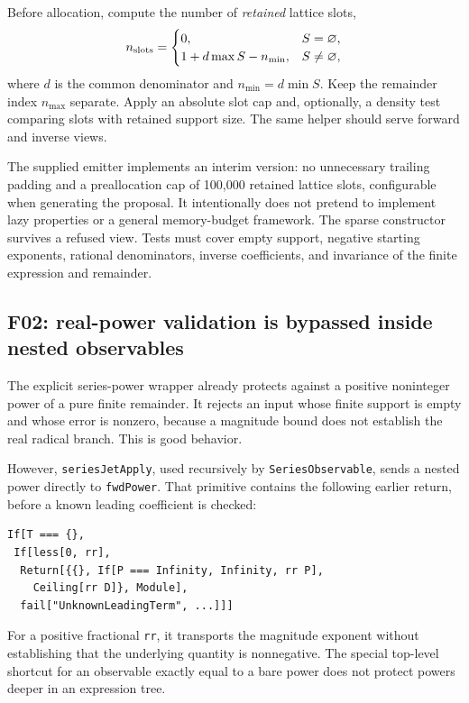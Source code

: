 Before allocation, compute the number of \emph{retained} lattice slots,
\[
 n_{\rm slots}=\begin{cases}
 0,&S=\varnothing,\\
 1+d\max S-n_{\min},&S\ne\varnothing,
 \end{cases}
\]
where $d$ is the common denominator and $n_{\min}=d\min S$. Keep the remainder index $n_{\max}$ separate. Apply an absolute slot cap and, optionally, a density test comparing slots with retained support size. The same helper should serve forward and inverse views.

The supplied emitter implements an interim version: no unnecessary trailing padding and a preallocation cap of 100,000 retained lattice slots, configurable when generating the proposal. It intentionally does not pretend to implement lazy properties or a general memory-budget framework. The sparse constructor survives a refused view. Tests must cover empty support, negative starting exponents, rational denominators, inverse coefficients, and invariance of the finite expression and remainder.

\subsection{F02: real-power validation is bypassed inside nested observables}
\label{sec:f02}


\cite{operations,core}

The explicit series-power wrapper already protects against a positive noninteger power of a pure finite remainder. It rejects an input whose finite support is empty and whose error is nonzero, because a magnitude bound does not establish the real radical branch. This is good behavior.

However, \texttt{seriesJetApply}, used recursively by \texttt{SeriesObservable}, sends a nested power directly to \texttt{fwdPower}. That primitive contains the following earlier return, before a known leading coefficient is checked:
\begin{lstlisting}
If[T === {},
 If[less[0, rr],
  Return[{{}, If[P === Infinity, Infinity, rr P],
    Ceiling[rr D]}, Module],
  fail["UnknownLeadingTerm", ...]]]
\end{lstlisting}
For a positive fractional \texttt{rr}, it transports the magnitude exponent without establishing that the underlying quantity is nonnegative. The special top-level shortcut for an observable exactly equal to a bare power does not protect powers deeper in an expression tree.

